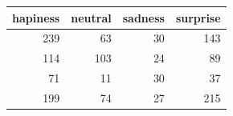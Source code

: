 \begin{tabular}{rrrr}
\toprule
hapiness & neutral & sadness & surprise \\
\midrule
239 & 63 & 30 & 143 \\
114 & 103 & 24 & 89 \\
71 & 11 & 30 & 37 \\
199 & 74 & 27 & 215 \\
\bottomrule
\end{tabular}
